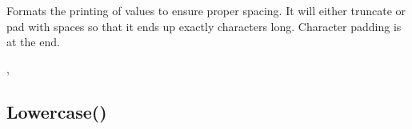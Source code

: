\documentclass[letterpaper,10pt,english]{sphinxmanual}
\begin{document}
\sphinxAtStartPar
Formats the printing of values to ensure proper spacing. It will either truncate or pad  with spaces so that it ends up exactly  characters long. Character padding is at the end.

\sphinxAtStartPar
{}

\begin{sphinxVerbatim}[commandchars=\\\{\}]
\end{sphinxVerbatim}

\sphinxAtStartPar
{}

\begin{sphinxVerbatim}[commandchars=\\\{\}]
\PYG{l+s+s2}{\PYGZdq{}[\PYGZdq{}}\PYG{l+s+s2}{\PYGZdq{}]\PYGZdq{}}
\PYG{l+s+s2}{\PYGZdq{}[\PYGZdq{}}\PYG{l+s+s2}{\PYGZdq{}]\PYGZdq{}}
\end{sphinxVerbatim}

\sphinxAtStartPar
{}

\sphinxAtStartPar
{}, 

\ignorespaces 

\subsection{Lowercase()}
\label{\detokenize{reference/peblstring:lowercase}}\label{\detokenize{reference/peblstring:index-3}}
\sphinxAtStartPar
{}

\sphinxAtStartPar
{}
\end{document}
